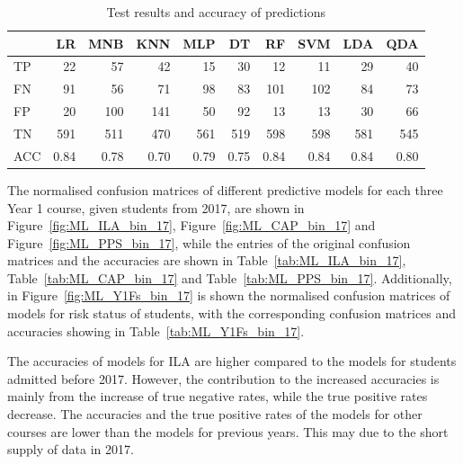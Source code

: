 \documentclass[a4paper]{report}
\begin{document}
\begin{table}[H]
  \centering
  \begin{tabular}{lrrrrrrrrr}
    \toprule
    {} &   LR &  MNB &  KNN &  MLP &   DT &   RF &  SVM &  LDA &  QDA \\
    \midrule
    TP  &   22 &   57 &   42 &   15 &   30 &   12 &   11 &   29 &   40 \\
    FN  &   91 &   56 &   71 &   98 &   83 &  101 &  102 &   84 &   73 \\
    FP  &   20 &  100 &  141 &   50 &   92 &   13 &   13 &   30 &   66 \\
    TN  &  591 &  511 &  470 &  561 &  519 &  598 &  598 &  581 &  545 \\
    ACC & 0.84 & 0.78 & 0.70 & 0.79 & 0.75 & 0.84 & 0.84 & 0.84 & 0.80 \\
    \bottomrule
  \end{tabular}
  \caption{\label{tab:ML_Y1Fs_bin_pre17}Test results and accuracy of predictions}
\end{table}

The normalised confusion matrices of different predictive models for each three Year 1 course, given students from 2017, are shown in Figure~\ref{fig:ML_ILA_bin_17}, Figure~\ref{fig:ML_CAP_bin_17} and Figure~\ref{fig:ML_PPS_bin_17}, while the entries of the original confusion matrices and the accuracies are shown in Table~\ref{tab:ML_ILA_bin_17}, Table~\ref{tab:ML_CAP_bin_17} and Table~\ref{tab:ML_PPS_bin_17}. Additionally, in Figure~\ref{fig:ML_Y1Fs_bin_17} is shown the normalised confusion matrices of models for risk status of students, with the corresponding confusion matrices and accuracies showing in Table~\ref{tab:ML_Y1Fs_bin_17}.  

The accuracies of models for ILA are higher compared to the models for students admitted before 2017. However, the contribution to the increased accuracies is mainly from the increase of true negative rates, while the true positive rates decrease. The accuracies and the true positive rates of the models for other courses are lower than the models for previous years. This may due to the short supply of data in 2017. 
\end{document}
